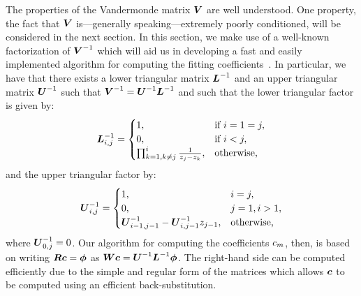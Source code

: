 The properties of the Vandermonde matrix $\boldsymbol{V}$ are well
understood. One property, the fact that $\boldsymbol{V}$
is---generally speaking---extremely poorly conditioned, will be
considered in the next section. In this section, we make use of a
well-known factorization of $\boldsymbol{V}^{-1}$ which will aid
us in developing a fast and easily implemented algorithm for computing
the fitting coefficients~\cite{inverse-vandermonde}. In particular, we
have that there exists a lower triangular matrix $\boldsymbol{L}^{-1}$ and an
upper triangular matrix $\boldsymbol{U}^{-1}$ such that
$\boldsymbol{V}^{-1} = \boldsymbol{U}^{-1}\boldsymbol{L}^{-1}$ and such that the
lower triangular factor is given by:
\begin{align}
  \label{eq:lower-tri-inverse}
  \boldsymbol{L}^{-1}_{i,j} = \begin{cases}
    1, &\mbox{if } i = 1 = j, \\
    0, &\mbox{if } i < j, \\
    \prod_{k=1,k\neq{}j}^i \frac{1}{z_j - z_k}, & \mbox{otherwise,}
  \end{cases}
\end{align}
and the upper triangular factor by:
\begin{align}
  \label{eq:upper-tri-inverse}
  \boldsymbol{U}^{-1}_{i,j} = \begin{cases}
    1, & i = j, \\
    0, & j = 1, i > 1, \\
    \boldsymbol{U}^{-1}_{i-1,j-1} - \boldsymbol{U}^{-1}_{i,j-1} z_{j-1}, & \mbox{otherwise,}
  \end{cases}
\end{align}
where $\boldsymbol{U}^{-1}_{0,j} = 0$. Our algorithm for computing the
coefficients ${c}_{m}$, then, is based on writing
$\boldsymbol{R}\boldsymbol{c} = \boldsymbol{\phi}$ as
$\boldsymbol{W}\boldsymbol{c} = \boldsymbol{U}^{-1}\boldsymbol{L}^{-1}\boldsymbol{\phi}$. The right-hand side
can be computed efficiently due to the simple and regular form of the
matrices which allows $\boldsymbol{c}$ to be computed using an efficient
back-substitution.


